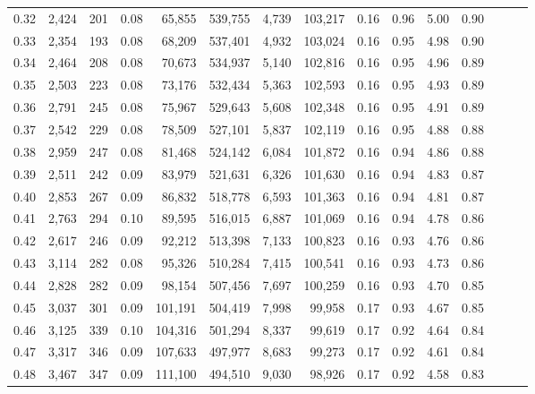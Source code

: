 \begin{tabular}{rrrrrrrrrrrrrrr}
0.32 &   2,424 &    201 &  0.08 &   65,855 &  539,755 &    4,739 &  103,217 &  0.16 &  0.96 &  5.00 &      0.90 \\
0.33 &   2,354 &    193 &  0.08 &   68,209 &  537,401 &    4,932 &  103,024 &  0.16 &  0.95 &  4.98 &      0.90 \\
0.34 &   2,464 &    208 &  0.08 &   70,673 &  534,937 &    5,140 &  102,816 &  0.16 &  0.95 &  4.96 &      0.89 \\
0.35 &   2,503 &    223 &  0.08 &   73,176 &  532,434 &    5,363 &  102,593 &  0.16 &  0.95 &  4.93 &      0.89 \\
0.36 &   2,791 &    245 &  0.08 &   75,967 &  529,643 &    5,608 &  102,348 &  0.16 &  0.95 &  4.91 &      0.89 \\
0.37 &   2,542 &    229 &  0.08 &   78,509 &  527,101 &    5,837 &  102,119 &  0.16 &  0.95 &  4.88 &      0.88 \\
0.38 &   2,959 &    247 &  0.08 &   81,468 &  524,142 &    6,084 &  101,872 &  0.16 &  0.94 &  4.86 &      0.88 \\
0.39 &   2,511 &    242 &  0.09 &   83,979 &  521,631 &    6,326 &  101,630 &  0.16 &  0.94 &  4.83 &      0.87 \\
0.40 &   2,853 &    267 &  0.09 &   86,832 &  518,778 &    6,593 &  101,363 &  0.16 &  0.94 &  4.81 &      0.87 \\
0.41 &   2,763 &    294 &  0.10 &   89,595 &  516,015 &    6,887 &  101,069 &  0.16 &  0.94 &  4.78 &      0.86 \\
0.42 &   2,617 &    246 &  0.09 &   92,212 &  513,398 &    7,133 &  100,823 &  0.16 &  0.93 &  4.76 &      0.86 \\
0.43 &   3,114 &    282 &  0.08 &   95,326 &  510,284 &    7,415 &  100,541 &  0.16 &  0.93 &  4.73 &      0.86 \\
0.44 &   2,828 &    282 &  0.09 &   98,154 &  507,456 &    7,697 &  100,259 &  0.16 &  0.93 &  4.70 &      0.85 \\
0.45 &   3,037 &    301 &  0.09 &  101,191 &  504,419 &    7,998 &   99,958 &  0.17 &  0.93 &  4.67 &      0.85 \\
0.46 &   3,125 &    339 &  0.10 &  104,316 &  501,294 &    8,337 &   99,619 &  0.17 &  0.92 &  4.64 &      0.84 \\
0.47 &   3,317 &    346 &  0.09 &  107,633 &  497,977 &    8,683 &   99,273 &  0.17 &  0.92 &  4.61 &      0.84 \\
0.48 &   3,467 &    347 &  0.09 &  111,100 &  494,510 &    9,030 &   98,926 &  0.17 &  0.92 &  4.58 &      0.83 \\

\end{tabular}

